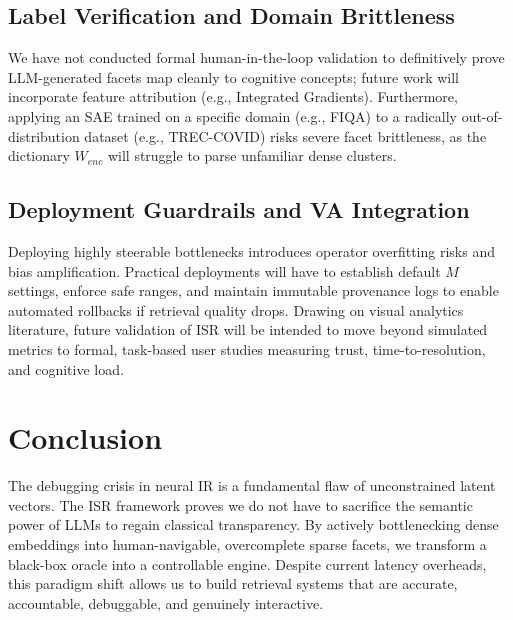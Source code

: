 \documentclass[sigconf,authordraft]{acmart}
\begin{document}
\subsection{Label Verification and Domain Brittleness}  
We have not conducted formal human-in-the-loop validation to definitively prove LLM-generated facets map cleanly to cognitive concepts; future work will incorporate feature attribution (e.g., Integrated Gradients). Furthermore, applying an SAE trained on a specific domain (e.g., FIQA) to a radically out-of-distribution dataset (e.g., TREC-COVID) risks severe facet brittleness, as the dictionary $W_{enc}$ will struggle to parse unfamiliar dense clusters.

\subsection{Deployment Guardrails and VA Integration} 
Deploying highly steerable bottlenecks introduces operator overfitting risks and bias amplification. Practical deployments will have to establish default $M$ settings, enforce safe ranges, and maintain immutable provenance logs to enable automated rollbacks if retrieval quality drops. Drawing on visual analytics literature, future validation of ISR will be intended to move beyond simulated metrics to formal, task-based user studies measuring trust, time-to-resolution, and cognitive load.

\section{Conclusion}
The debugging crisis in neural IR is a fundamental flaw of unconstrained latent vectors. The ISR framework proves we do not have to sacrifice the semantic power of LLMs to regain classical transparency. By actively bottlenecking dense embeddings into human-navigable, overcomplete sparse facets, we transform a black-box oracle into a controllable engine. Despite current latency overheads, this paradigm shift allows us to build retrieval systems that are accurate, accountable, debuggable, and genuinely interactive.


\end{document}

